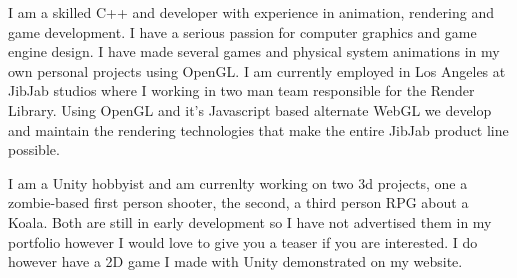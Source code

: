 I am a skilled C++ and developer with experience in animation, rendering and game development.
I have a serious passion for computer graphics and game engine design.
I have made several games and physical system animations in my own personal projects using OpenGL.
I am currently employed in Los Angeles at JibJab studios where I working in two man team responsible for the Render Library.
Using OpenGL and it's Javascript based alternate WebGL we develop and maintain the rendering technologies that make the entire JibJab product line possible. 

I am a Unity hobbyist and am currenlty working on two 3d projects, one a zombie-based first person shooter, the second, a third person RPG about a Koala.
Both are still in early development so I have not advertised them in my portfolio however I would love to give you a teaser if you are interested. 
I do however have a 2D game I made with Unity demonstrated on my website.




